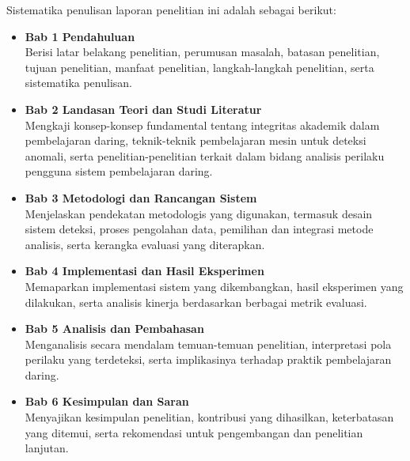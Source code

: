 Sistematika penulisan laporan penelitian ini adalah sebagai berikut:

\begin{itemize}
\item \textbf{Bab 1 Pendahuluan}\\
Berisi latar belakang penelitian, perumusan masalah, batasan penelitian, tujuan penelitian, manfaat penelitian, langkah-langkah penelitian, serta sistematika penulisan.

\item \textbf{Bab 2 Landasan Teori dan Studi Literatur}\\
Mengkaji konsep-konsep fundamental tentang integritas akademik dalam pembelajaran daring, teknik-teknik pembelajaran mesin untuk deteksi anomali, serta penelitian-penelitian terkait dalam bidang analisis perilaku pengguna sistem pembelajaran daring.

\item \textbf{Bab 3 Metodologi dan Rancangan Sistem}\\
Menjelaskan pendekatan metodologis yang digunakan, termasuk desain sistem deteksi, proses pengolahan data, pemilihan dan integrasi metode analisis, serta kerangka evaluasi yang diterapkan.

\item \textbf{Bab 4 Implementasi dan Hasil Eksperimen}\\
Memaparkan implementasi sistem yang dikembangkan, hasil eksperimen yang dilakukan, serta analisis kinerja berdasarkan berbagai metrik evaluasi.

\item \textbf{Bab 5 Analisis dan Pembahasan}\\
Menganalisis secara mendalam temuan-temuan penelitian, interpretasi pola perilaku yang terdeteksi, serta implikasinya terhadap praktik pembelajaran daring.

\item \textbf{Bab 6 Kesimpulan dan Saran}\\
Menyajikan kesimpulan penelitian, kontribusi yang dihasilkan, keterbatasan yang ditemui, serta rekomendasi untuk pengembangan dan penelitian lanjutan.
\end{itemize}

